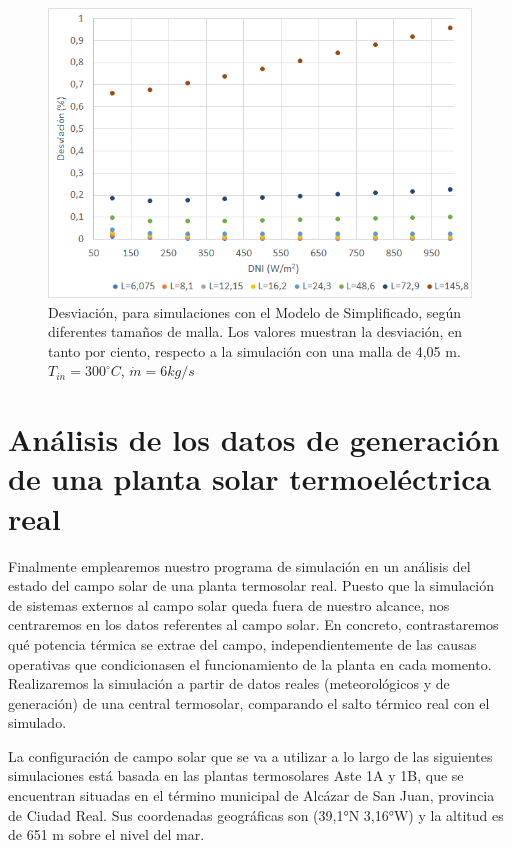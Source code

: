 \begin{figure}[H]
\includegraphics[width=0.9\linewidth]{images/desviacionmodelsimplificadomalla.png}
\caption{Desviación, para simulaciones con el Modelo de Simplificado, según diferentes tamaños de malla. Los valores muestran la desviación, en tanto por ciento, respecto a la simulación con una malla de 4,05 m. $T_{in}=300 ^\circ C$, $\dot m = 6 kg/s$} 
\label{fig:desviacionmodelsimplificado}
\end{figure}


\section{Análisis de los datos de generación de una planta solar termoeléctrica real}
\label{descripcion-central}

Finalmente emplearemos nuestro programa de simulación en un análisis del estado del campo solar de una planta termosolar real. Puesto que la simulación de sistemas externos al campo solar queda fuera de nuestro alcance, nos centraremos en los datos referentes al campo solar. En concreto, contrastaremos  qué potencia térmica se extrae del campo, independientemente de las causas operativas que condicionasen el funcionamiento de la planta en cada momento. Realizaremos la simulación a partir de datos reales (meteorológicos y de generación) de una central termosolar, comparando el salto térmico real con el simulado. 

La configuración de campo solar que se va a utilizar a lo largo de las siguientes simulaciones está basada en las plantas termosolares Aste 1A y 1B, que se encuentran situadas en el término municipal de Alcázar de San Juan, provincia de Ciudad Real. Sus coordenadas geográficas son (39,1°N 3,16°W) y la altitud es de 651 m sobre el nivel del mar.

